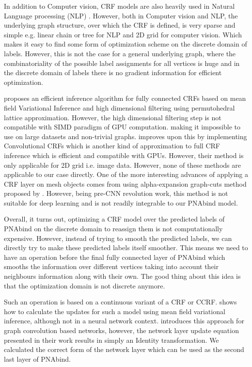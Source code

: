 In addition to Computer vision, CRF models are also heavily used in Natural Language processing (NLP)
\citep{roark2004discriminative,mccallum2003early,liu2017identification}. However, both in Computer vision and NLP, the underlying graph structure, over which the CRF is defined, is very sparse and simple e.g. linear chain or tree for NLP and 2D grid for computer vision. Which makes it easy to
find some form of optimization scheme on the discrete domain of labels. However, this is not the
case for a general underlying graph, where the combinatoriality of the possible label assignments
for all vertices is huge and in the discrete domain of labels there is no gradient information for
efficient optimization.

\citet{krahenbuhl2012efficient} proposes an efficient inference algorithm for fully connected CRFs
based on mean field Variational Inference and high dimensional filtering using permutohedral lattice
approximation. However, the high dimensional filtering step is not compatible with
SIMD\citep{nickolls2008scalable} paradigm of GPU computation. \citep{teichmann2018convolutional}
making it impossible to use on large datasets and non-trivial graphs.
\citet{teichmann2018convolutional} improves upon this by implementing Convolutional CRFs which is
another kind of approximation to full CRF inference which is efficient and compatible with GPUs.
However, their method is only applicable for 2D grid i.e. image data.  However, none of these methods
are applicable to our case directly. One of the more interesting advances of applying a CRF layer on
mesh objects comes from \citet{kalogerakis2010learning} using alpha-expansion graph-cuts method proposed by
\citet{boykov2001fast}. However, being pre-CNN revolution work, this method is not suitable for deep
learning and is not readily integrable to our PNAbind model. 
\par
Overall, it turns out, optimizing a CRF model over the predicted labels of PNAbind on the discrete domain to reassign them is not computationally expensive. However, instead of trying to smooth the predicted labels, we can directly try to make these predicted labels itself smoother. This means we need to have an operation before the final fully connected layer of PNAbind which smooths the information over different vertices taking into account their neighbours information along with their own. The good thing about this idea is that the optimization domain is not discrete anymore.

Such an operation is based on a continuous variant of a CRF or CCRF. \citet{ristovski2013continuous}
shows how to calculate the updates for such a model using mean field variational inference, although
not in a neural network context. \citet{gao2019conditional} introduces this approach for graph convolution based networks, however, the network layer update equation presented in their work results in simply an Identity transformation. We calculated the correct
form of the network layer which can be used as the second last layer of PNAbind.

